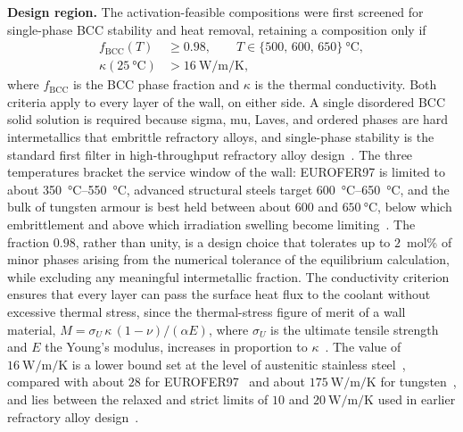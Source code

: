 \textbf{Design region.} The activation-feasible compositions were first screened
for single-phase BCC stability and heat removal, retaining a composition only if
\begin{equation}
\begin{aligned}
f_{\mathrm{BCC}}(T) &\ge 0.98, \qquad T \in \{500,\, 600,\, 650\}~\si{\celsius},\\
\kappa(\SI{25}{\celsius}) &> \SI{16}{\watt\per\meter\per\kelvin},
\end{aligned}
\label{eq:filters}
\end{equation}
where \(f_{\mathrm{BCC}}\) is the BCC phase fraction and \(\kappa\) is the thermal
conductivity. Both criteria apply to every layer of the wall, on either side. A
single disordered BCC solid solution is required because sigma, mu, Laves, and
ordered phases are hard intermetallics that embrittle refractory alloys, and
single-phase stability is the standard first filter in high-throughput refractory
alloy design~\cite{senkov2015accelerated,senkov2018review,vela2023highthroughput}.
The three temperatures bracket the service window of the wall: EUROFER97 is limited
to about \SIrange{350}{550}{\celsius}, advanced structural steels target
\SIrange{600}{650}{\celsius}, and the bulk of tungsten armour is best held between
about \(600\) and \(\SI{650}{\celsius}\), below which embrittlement and above which
irradiation swelling become
limiting~\cite{zinkle2000operating,stork2014developing,zinkle2017development}. The
fraction \(0.98\), rather than unity, is a design choice that tolerates up to
\(2\)~mol\% of minor phases arising from the numerical tolerance of the equilibrium
calculation, while excluding any meaningful intermetallic fraction. The
conductivity criterion ensures that every layer can pass the surface heat flux to
the coolant without excessive thermal stress, since the thermal-stress figure of
merit of a wall material, \(M=\sigma_U\,\kappa\,(1-\nu)/(\alpha E)\), where
\(\sigma_U\) is the ultimate tensile strength and \(E\) the Young's modulus,
increases in proportion to \(\kappa\)~\cite{zinkle2000operating}. The value of
\(\SI{16}{\watt\per\meter\per\kelvin}\) is a lower bound set at the level of
austenitic stainless steel~\cite{kim1975thermophysical}, compared with about \(28\)
for EUROFER97~\cite{tavassoli2004materials} and about
\(\SI{175}{\watt\per\meter\per\kelvin}\) for tungsten~\cite{tolias2017analytical},
and lies between the relaxed and strict limits of \(10\) and
\(\SI{20}{\watt\per\meter\per\kelvin}\) used in earlier refractory alloy
design~\cite{khatamsaz2023bayesian}.

